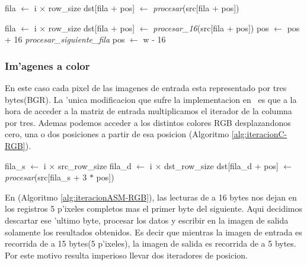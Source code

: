 \begin{algorithm}[h!]
\caption{}\label{alg:iteracionC-BN}
\begin{algorithmic}[1]
	\STATE fila $\leftarrow$ i $\times$ row\_size
		\STATE dst[fila + pos] $\leftarrow$ \textit{procesar}(src[fila + pos])
	\ENDFOR
\ENDFOR
\end{algorithmic}
\end{algorithm}

\begin{algorithm}[h!]
\caption{}\label{alg:iteracionASM-BN}
\begin{algorithmic}[1]
	\STATE fila $\leftarrow$ i $\times$ row\_size
		\STATE dst[fila + pos] $\leftarrow$ \textit{procesar_{16}}(src[fila + pos])
		\STATE pos $\leftarrow$ pos + 16		
			\STATE \textit{procesar\_siguiente\_fila}
			\STATE pos $\leftarrow$ w - 16
		\ENDIF
		
	\ENDFOR
\ENDFOR
\end{algorithmic}
\end{algorithm}

\subsubsection{Im'agenes a color}
En este caso cada pixel de las imagenes de entrada esta representado por tres bytes(BGR). La 'unica modificacion que sufre la implementacion en \C\ es que a la hora de acceder a la matriz de entrada multiplicamos el iterador de la columna por tres. Ademas podemos acceder a los distintos colores RGB desplazandonos cero, una o dos posiciones a partir de esa posicion (Algoritmo \ref{alg:iteracionC-RGB}).


\begin{algorithm}[h!]
\caption{}\label{alg:iteracionC-RGB}
\begin{algorithmic}[1]
	\STATE fila_s $\leftarrow$ i $\times$ src\_row\_size	
	\STATE fila_d $\leftarrow$ i $\times$ dst\_row\_size
		\STATE dst[fila_d + pos] $\leftarrow$ \textit{procesar}(src[fila_s + 3 $*$ pos])
	\ENDFOR
\ENDFOR
\end{algorithmic}
\end{algorithm}

En \ass (Algoritmo \ref{alg:iteracionASM-RGB}), las lecturas de a 16 bytes nos dejan en los registros 5 p'ixeles completos mas el primer byte del siguiente. Aqui decidimos descartar ese 'ultimo byte, procesar los datos y escribir en la imagen de salida solamente los resultados obtenidos. Es decir que mientras la imagen de entrada es recorrida de a 15 bytes(5 p'ixeles), la imagen de salida es recorrida de a 5 bytes. Por este motivo resulta imperioso llevar dos iteradores de posicion.

